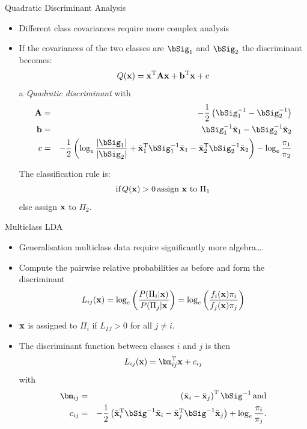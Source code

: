 \documentclass{beamer}
\begin{document}
\begin{frame}{Quadratic Discriminant Analysis}
  \begin{itemize}
    \item Different class covariances require more complex analysis
    \item If the covariances of the two classes are $\bSig_1$ and $\bSig_2$ the discriminant becomes:
      \begin{equation*}
        Q(\mathbf{x}) = \mathbf{x}^{\mathrm{T}}\mathbf{A}\mathbf{x} + \mathbf{b}^{\mathrm{T}}\mathbf{x} + c
      \end{equation*}
      a \textit{Quadratic discriminant} with
      \begin{eqnarray*}
        \bA &=& -\frac{1}{2}\left(\bSig_1^{-1}-\bSig_2^{-1}\right) \\
        \bb &=& \bSig^{-1}_1\bar\bx_1 - \bSig^{-1}_2\bar\bx_2 \\
        c &=& -\frac{1}{2}\left(\log_e\frac{\abs{\bSig_1}}{\abs{\bSig_2}}+\bar\bx_1^\rT\bSig_1^{-1}\bar\bx_1-\bar\bx_2^\rT\bSig_2^{-1}\bar\bx_2\right)-\log_e\frac{\pi_1}{\pi_2}
      \end{eqnarray*}

      The classification rule is:
      \begin{equation*}
        \mbox{if}\,Q(\mathbf{x})>0\,\mbox{assign $\mathbf{x}$ to $\Pi_1$}
      \end{equation*}
      else assign $\mathbf{x}$ to $\Pi_2$. 
  \end{itemize}
\end{frame}

\begin{frame}{Multiclass LDA}
  \begin{itemize}
    \item Generalisation multiclass data require significantly more algebra\dots.
    \item Compute the pairwise relative probabilities as before and form the discriminant
      \begin{equation*}
        L_{ij}(\mathbf{x}) = \log_e\left(\frac{P(\Pi_i|\mathbf{x})}{P(\Pi_j|\mathbf{x}}\right)=\log_e\left(\frac{f_i(\mathbf{x})\pi_i}{f_j(\mathbf{x})\pi_j}\right)
      \end{equation*}
    \item $\mathbf{x}$ is assigned to $\Pi_i$ if $L_{IJ}>0$ for all $j\neq i$. 
    \item The discriminant function between classes $i$ and $j$ is then
      \begin{equation*}
        L_{ij}(\bx) =\bm^\rT_{ij}\bx+c_{ij}
      \end{equation*}
      with 
      \begin{eqnarray*}
        \bm_{ij} &=& \left(\bar\bx_i-\bar\bx_j\right)^\rT\bSig^{-1}\, \mbox{and}\\
        c_{ij}&=&-\frac{1}{2}\left(\bar\bx_i^\rT\bSig^{-1}\bar\bx_i - \bar\bx_j^\rT\bSig^{-1}\bar\bx_j\right)+\log_e\frac{\pi_i}{\pi_j}.
      \end{eqnarray*}
  \end{itemize}
\end{frame}
\end{document}
